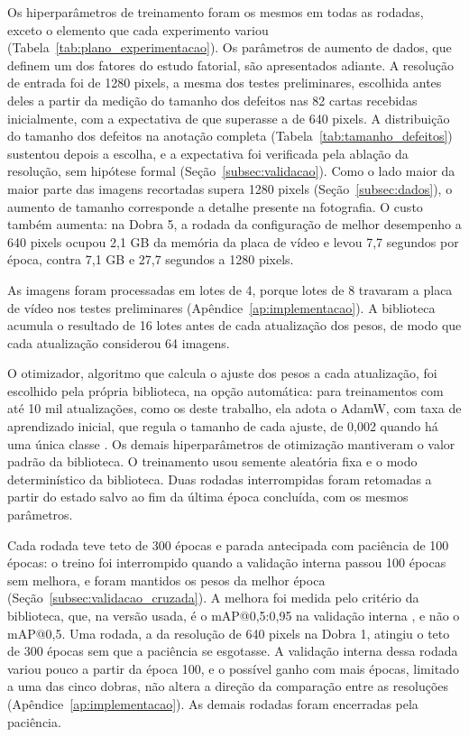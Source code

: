 \documentclass[
    12pt,                %
    openright,           %
    oneside,             %
    a4paper,             %
    english,             %
    brazil               %
]{abntex2}
\begin{document}
Os hiperparâmetros de treinamento foram os mesmos em todas as rodadas,
exceto o elemento que cada experimento variou
(Tabela~\ref{tab:plano_experimentacao}). Os parâmetros de aumento de
dados, que definem um dos fatores do estudo fatorial, são apresentados
adiante. A resolução
de entrada foi de 1280 pixels, a mesma dos testes preliminares,
escolhida antes deles a partir da medição do tamanho dos defeitos nas
82 cartas recebidas inicialmente, com a expectativa de que superasse a
de 640 pixels. A
distribuição do tamanho dos defeitos na anotação completa
(Tabela~\ref{tab:tamanho_defeitos}) sustentou depois a escolha, e a
expectativa foi verificada pela ablação
da resolução, sem hipótese formal (Seção~\ref{subsec:validacao}). Como o lado maior da maior parte das
imagens recortadas supera 1280 pixels (Seção~\ref{subsec:dados}), o
aumento de tamanho corresponde a detalhe presente na fotografia. O
custo também aumenta: na Dobra 5, a rodada da configuração de melhor
desempenho a 640 pixels ocupou 2,1 GB da memória da placa de vídeo e
levou 7,7 segundos por época, contra 7,1 GB e 27,7 segundos a 1280
pixels.

As imagens foram processadas em lotes de 4, porque lotes de 8
travaram a placa de vídeo nos testes preliminares
(Apêndice~\ref{ap:implementacao}). A biblioteca
acumula o resultado de 16 lotes antes de cada atualização dos pesos,
de modo que cada atualização considerou 64 imagens.

O otimizador, algoritmo que calcula o ajuste dos pesos a cada
atualização, foi escolhido pela própria biblioteca, na opção
automática: para treinamentos com até 10 mil atualizações, como os
deste trabalho, ela adota o AdamW, com taxa de aprendizado inicial, que
regula o tamanho de cada ajuste, de 0,002 quando há uma única classe
\cite{Jocher2023}. Os demais hiperparâmetros de otimização mantiveram o
valor padrão da biblioteca. O treinamento usou semente aleatória fixa e
o modo determinístico da biblioteca. Duas rodadas interrompidas foram
retomadas a partir do estado salvo ao fim da última época concluída,
com os mesmos parâmetros.

Cada rodada teve teto de 300 épocas e parada antecipada com paciência
de 100 épocas: o treino foi interrompido quando a validação interna
passou 100 épocas sem melhora, e foram mantidos os pesos da melhor
época (Seção~\ref{subsec:validacao_cruzada}). A melhora foi medida pelo
critério da biblioteca, que, na versão usada, é o mAP@0,5:0,95 na
validação interna \cite{Jocher2023}, e não o mAP@0,5. Uma rodada, a da
resolução de 640 pixels na Dobra 1, atingiu o teto de 300 épocas sem
que a paciência se esgotasse. A validação interna dessa rodada variou
pouco a partir da época 100, e o possível ganho com mais épocas,
limitado a uma das cinco
dobras, não altera a direção da comparação entre as resoluções
(Apêndice~\ref{ap:implementacao}). As demais rodadas foram encerradas
pela paciência.
\end{document}
